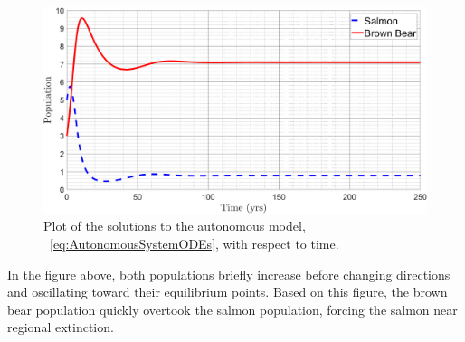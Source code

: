 \begin{figure}[H]
    \centering
    \includegraphics[width=14cm]{Pictures/System ODEs/AutonomousModelRespectTime.png}
    \caption{\singlespacing
    Plot of  the solutions to the autonomous model, \equationautorefname~\eqref{eq:AutonomousSystemODEs}, with respect to time.}
    \label{fig:SolutionsNonAutonomous}
\end{figure}
In the figure above, both populations briefly increase before changing directions and oscillating toward their equilibrium points.
Based on this figure, the brown bear population quickly overtook the salmon population, forcing the salmon near regional extinction.

